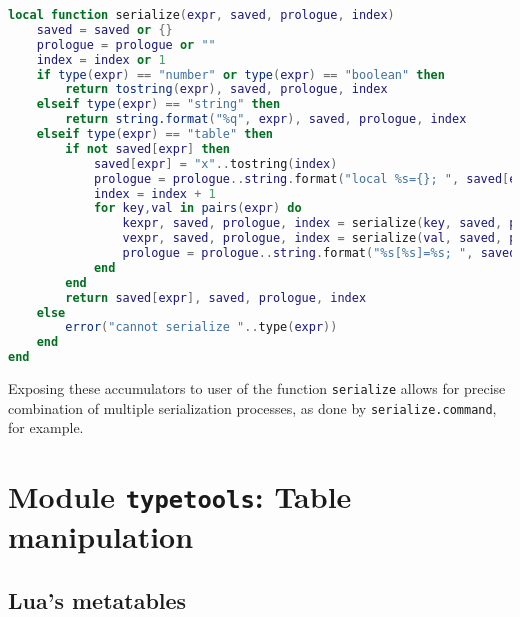 \begin{lstlisting}[language=lua, caption={The private function \texttt{serialize} of the module \texttt{serialize}}, label=lst:serialize, name=lst:serialize]
local function serialize(expr, saved, prologue, index)
	saved = saved or {}
	prologue = prologue or ""
	index = index or 1
	if type(expr) == "number" or type(expr) == "boolean" then
		return tostring(expr), saved, prologue, index
	elseif type(expr) == "string" then
		return string.format("%q", expr), saved, prologue, index
	elseif type(expr) == "table" then
		if not saved[expr] then
			saved[expr] = "x"..tostring(index)
			prologue = prologue..string.format("local %s={}; ", saved[expr])
			index = index + 1
			for key,val in pairs(expr) do
				kexpr, saved, prologue, index = serialize(key, saved, prologue, index)
				vexpr, saved, prologue, index = serialize(val, saved, prologue, index)
				prologue = prologue..string.format("%s[%s]=%s; ", saved[expr], kexpr, vexpr)
			end
		end
		return saved[expr], saved, prologue, index
	else
		error("cannot serialize "..type(expr))
	end
end
\end{lstlisting}

Exposing these accumulators to user of the function \texttt{serialize} allows for precise combination of multiple serialization processes, as done by \texttt{serialize.command}, for example.


\section{Module \texttt{typetools}: Table manipulation}
\label{sec:tools:typetools}

\subsection{Lua's metatables}
\label{sec:metatables}

